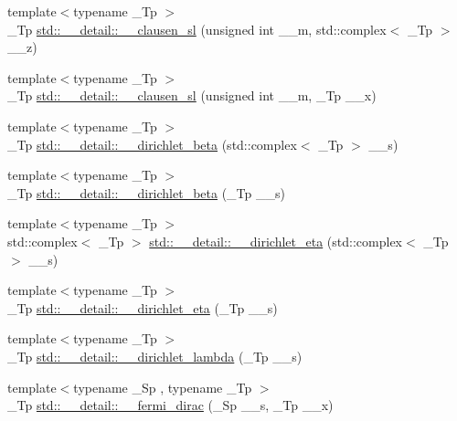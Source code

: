 \begin{DoxyCompactItemize}
\item 
{\footnotesize template$<$typename \+\_\+\+Tp $>$ }\\\+\_\+\+Tp \hyperlink{namespacestd_1_1____detail_ab7d250f236ef63ed8bd260881b73524d}{std\+::\+\_\+\+\_\+detail\+::\+\_\+\+\_\+clausen\+\_\+sl} (unsigned int \+\_\+\+\_\+m, std\+::complex$<$ \+\_\+\+Tp $>$ \+\_\+\+\_\+z)
\item 
{\footnotesize template$<$typename \+\_\+\+Tp $>$ }\\\+\_\+\+Tp \hyperlink{namespacestd_1_1____detail_a554bb352d6397ea5991400eb3734165f}{std\+::\+\_\+\+\_\+detail\+::\+\_\+\+\_\+clausen\+\_\+sl} (unsigned int \+\_\+\+\_\+m, \+\_\+\+Tp \+\_\+\+\_\+x)
\item 
{\footnotesize template$<$typename \+\_\+\+Tp $>$ }\\\+\_\+\+Tp \hyperlink{namespacestd_1_1____detail_ad0c8e975438d30cbfb5cad91f3ac6d01}{std\+::\+\_\+\+\_\+detail\+::\+\_\+\+\_\+dirichlet\+\_\+beta} (std\+::complex$<$ \+\_\+\+Tp $>$ \+\_\+\+\_\+s)
\item 
{\footnotesize template$<$typename \+\_\+\+Tp $>$ }\\\+\_\+\+Tp \hyperlink{namespacestd_1_1____detail_a2e4243f8d092d48e16fc45ba0c4e9489}{std\+::\+\_\+\+\_\+detail\+::\+\_\+\+\_\+dirichlet\+\_\+beta} (\+\_\+\+Tp \+\_\+\+\_\+s)
\item 
{\footnotesize template$<$typename \+\_\+\+Tp $>$ }\\std\+::complex$<$ \+\_\+\+Tp $>$ \hyperlink{namespacestd_1_1____detail_a3d8d694bf430ca3959c9e6b00c332468}{std\+::\+\_\+\+\_\+detail\+::\+\_\+\+\_\+dirichlet\+\_\+eta} (std\+::complex$<$ \+\_\+\+Tp $>$ \+\_\+\+\_\+s)
\item 
{\footnotesize template$<$typename \+\_\+\+Tp $>$ }\\\+\_\+\+Tp \hyperlink{namespacestd_1_1____detail_a88be5bbcdf85bbc487b6b86b5cb65d98}{std\+::\+\_\+\+\_\+detail\+::\+\_\+\+\_\+dirichlet\+\_\+eta} (\+\_\+\+Tp \+\_\+\+\_\+s)
\item 
{\footnotesize template$<$typename \+\_\+\+Tp $>$ }\\\+\_\+\+Tp \hyperlink{namespacestd_1_1____detail_a6ee8ae93ba65207de8ef3d6bb162b192}{std\+::\+\_\+\+\_\+detail\+::\+\_\+\+\_\+dirichlet\+\_\+lambda} (\+\_\+\+Tp \+\_\+\+\_\+s)
\item 
{\footnotesize template$<$typename \+\_\+\+Sp , typename \+\_\+\+Tp $>$ }\\\+\_\+\+Tp \hyperlink{namespacestd_1_1____detail_a470e563c4e88c433f94dca391814dc61}{std\+::\+\_\+\+\_\+detail\+::\+\_\+\+\_\+fermi\+\_\+dirac} (\+\_\+\+Sp \+\_\+\+\_\+s, \+\_\+\+Tp \+\_\+\+\_\+x)

\end{DoxyCompactItemize}
